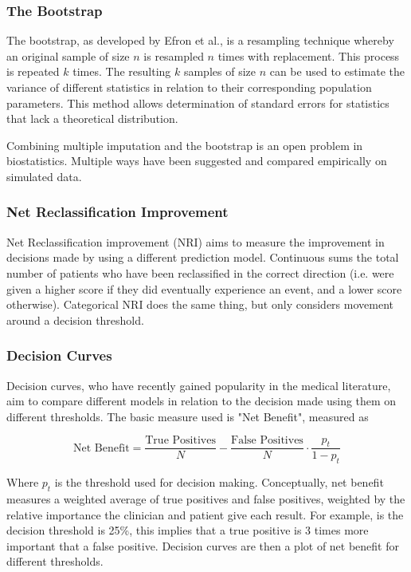 \documentclass[a4paper,12pt]{article}
\begin{document}
		\subsubsection{The Bootstrap}
		The bootstrap, as developed by Efron et al.\cite{BradleyEfron1994}, is a resampling technique whereby an original sample of size $ n $ is resampled $ n $ times with replacement. This process is repeated $ k $ times. The resulting $ k  $ samples of size $ n  $ can be used to estimate the variance of different statistics in relation to their corresponding population parameters. This method allows determination of standard errors for statistics that lack a theoretical distribution.
		
		Combining multiple imputation and the bootstrap is an open problem in biostatistics. Multiple ways have been suggested and compared empirically on simulated data\cite{Schomaker2016}.
		
		\subsubsection{Net Reclassification Improvement}
		Net Reclassification improvement (NRI) aims to measure the improvement in decisions made by using a different prediction model\cite{Pencina2008}. Continuous sums the total number of patients who have been reclassified in the correct direction (i.e. were given a higher score if they did eventually experience an event, and a lower score otherwise). Categorical NRI does the same thing, but only considers movement around a decision threshold.
		
		\subsubsection{Decision Curves}
		Decision curves, who have recently gained popularity in the medical literature\cite{Vickers2016}, aim to compare different models in relation to the decision made using them on different thresholds. The basic measure used is "Net Benefit", measured as
		
		\begin{equation*}
		\text{Net Benefit} = \frac{\text{True Positives}}{N} - \frac{\text{False Positives}}{N} \cdot \frac{p_t}{1-p_t}
		\end{equation*}
		
		Where $ p_t $ is the threshold used for decision making. Conceptually, net benefit measures a weighted average of true positives and false positives, weighted by the relative importance the clinician and patient give each result. For example, is the decision threshold is 25\%, this implies that a true positive is 3 times more important that a false positive. Decision curves are then a plot of net benefit for different thresholds.
		
\end{document}
